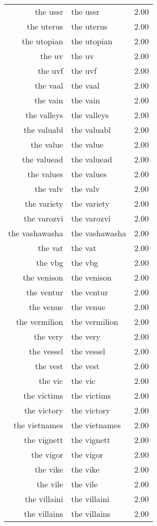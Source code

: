 \begin{table}[ht]
\begin{tabular}{rlr}
  the ussr & the ussr & 2.00 \\ 
  the uterus & the uterus & 2.00 \\ 
  the utopian & the utopian & 2.00 \\ 
  the uv & the uv & 2.00 \\ 
  the uvf & the uvf & 2.00 \\ 
  the vaal & the vaal & 2.00 \\ 
  the vain & the vain & 2.00 \\ 
  the valleys & the valleys & 2.00 \\ 
  the valuabl & the valuabl & 2.00 \\ 
  the value & the value & 2.00 \\ 
  the valuead & the valuead & 2.00 \\ 
  the values & the values & 2.00 \\ 
  the valv & the valv & 2.00 \\ 
  the variety & the variety & 2.00 \\ 
  the varozvi & the varozvi & 2.00 \\ 
  the vashawasha & the vashawasha & 2.00 \\ 
  the vat & the vat & 2.00 \\ 
  the vbg & the vbg & 2.00 \\ 
  the venison & the venison & 2.00 \\ 
  the ventur & the ventur & 2.00 \\ 
  the venue & the venue & 2.00 \\ 
  the vermilion & the vermilion & 2.00 \\ 
  the very & the very & 2.00 \\ 
  the vessel & the vessel & 2.00 \\ 
  the vest & the vest & 2.00 \\ 
  the vic & the vic & 2.00 \\ 
  the victims & the victims & 2.00 \\ 
  the victory & the victory & 2.00 \\ 
  the vietnames & the vietnames & 2.00 \\ 
  the vignett & the vignett & 2.00 \\ 
  the vigor & the vigor & 2.00 \\ 
  the vike & the vike & 2.00 \\ 
  the vile & the vile & 2.00 \\ 
  the villaini & the villaini & 2.00 \\ 
  the villains & the villains & 2.00 \\ 

\end{tabular}
\end{table}
